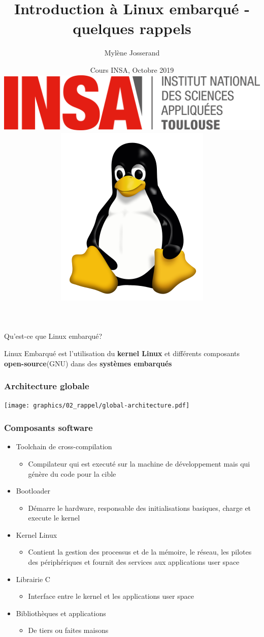 \documentclass[aspectratio=169,obeyspaces,spaces,hyphens,dvipsnames]{beamer}
\title{Introduction à Linux embarqué - quelques rappels}
\author[Mylène Josserand]
{Mylène Josserand}
\date[Octobre 2019]
{Cours INSA, Octobre 2019 \\
  \vspace{0.5cm}
  \includegraphics[scale=0.1]{pictures/insa-tls.png}
  \hspace{0.5cm}
  \includegraphics[scale=0.1]{pictures/tux.png}
}
\institute[]
{Développeuse et formatrice Linux embarqué}
\begin{document}
\begin{frame}
  \titlepage
\end{frame}

\begin{frame}{Qu'est-ce que Linux embarqué?}
  \huge
  \begin{center}
    Linux Embarqué est l'utilisation du {\bf kernel Linux} et différents
    composants {\bf open-source}(GNU) dans des {\bf systèmes embarqués}
  \end{center}
\end{frame}

\begin{frame}
  \frametitle{Architecture globale}
  \begin{center}
    \texttt{[image: graphics/02\_rappel/global-architecture.pdf]}
  \end{center}
\end{frame}

\begin{frame}
  \frametitle{Composants software}
  \begin{itemize}
  \item Toolchain de cross-compilation
    \begin{itemize}
    \item Compilateur qui est executé sur la machine de développement
      mais qui génère du code pour la cible
    \end{itemize}
  \item Bootloader
    \begin{itemize}
    \item Démarre le hardware, responsable des initialisations basiques,
      charge et execute le kernel
    \end{itemize}
  \item Kernel Linux
    \begin{itemize}
    \item Contient la gestion des processus et de la mémoire, le réseau, les
      pilotes des périphériques et fournit des services aux applications
      user space
    \end{itemize}
  \item Librairie C
    \begin{itemize}
    \item Interface entre le kernel et les applications user space
    \end{itemize}
  \item Bibliothèques et applications
    \begin{itemize}
    \item De tiers ou faites maisons
    \end{itemize}
  \end{itemize}
\end{frame}
\end{document}
